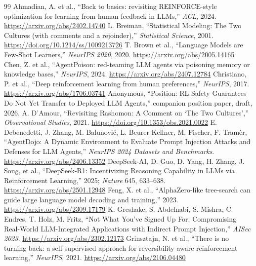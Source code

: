 \documentclass{article}
\begin{document}
\begin{thebibliography}{99}
\small
{} Ahmadian, A. et al., ``Back to basics: revisiting REINFORCE-style optimization for learning from human feedback in LLMs,'' \emph{ACL}, 2024. \url{https://arxiv.org/abs/2402.14740}
 L. Breiman, ``Statistical Modeling: The Two Cultures (with comments and a rejoinder),'' \emph{Statistical Science}, 2001. \url{https://doi.org/10.1214/ss/1009213726}
 T. Brown et al., ``Language Models are Few-Shot Learners,'' \emph{NeurIPS 2020}, 2020. \url{https://arxiv.org/abs/2005.14165}
 Chen, Z. et al., ``AgentPoison: red-teaming LLM agents via poisoning memory or knowledge bases,'' \emph{NeurIPS}, 2024. \url{https://arxiv.org/abs/2407.12784}
 Christiano, P. et al., ``Deep reinforcement learning from human preferences,'' \emph{NeurIPS}, 2017. \url{https://arxiv.org/abs/1706.03741}
 Anonymous, ``Position: RL Safety Guarantees Do Not Yet Transfer to Deployed LLM Agents,'' companion position paper, draft, 2026.
 A. D'Amour, ``Revisiting Rashomon: A Comment on `The Two Cultures','' \emph{Observational Studies}, 2021. \url{https://doi.org/10.1353/obs.2021.0022}
 E. Debenedetti, J. Zhang, M. Balunović, L. Beurer-Kellner, M. Fischer, F. Tramèr, ``AgentDojo: A Dynamic Environment to Evaluate Prompt Injection Attacks and Defenses for LLM Agents,'' \emph{NeurIPS 2024 Datasets and Benchmarks}. \url{https://arxiv.org/abs/2406.13352}
 DeepSeek-AI, D. Guo, D. Yang, H. Zhang, J. Song, et al., ``DeepSeek-R1: Incentivizing Reasoning Capability in LLMs via Reinforcement Learning,'' 2025; \emph{Nature} 645, 633--638. \url{https://arxiv.org/abs/2501.12948}
 Feng, X. et al., ``AlphaZero-like tree-search can guide large language model decoding and training,'' 2023. \url{https://arxiv.org/abs/2309.17179}
 K. Greshake, S. Abdelnabi, S. Mishra, C. Endres, T. Holz, M. Fritz, ``Not What You've Signed Up For: Compromising Real-World LLM-Integrated Applications with Indirect Prompt Injection,'' \emph{AISec 2023}. \url{https://arxiv.org/abs/2302.12173}
 Grinsztajn, N. et al., ``There is no turning back: a self-supervised approach for reversibility-aware reinforcement learning,'' \emph{NeurIPS}, 2021. \url{https://arxiv.org/abs/2106.04480}

\end{thebibliography}
\end{document}
